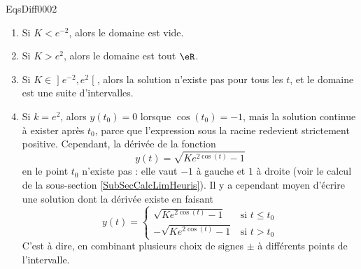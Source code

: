 \begin{corrige}{EqsDiff0002}
\begin{enumerate}
\begin{enumerate}
\item
Si $K<e^{-2}$, alors le domaine est vide.
\item
Si $K>e^2$, alors le domaine est tout $\eR$.
\item
Si $K\in\mathopen]e^{-2},e^2\mathclose[$, alors la solution n'existe pas pour tous les $t$, et le domaine est une suite d'intervalles.
\item
Si $k=e^2$, alors $y(t_0)=0$ lorsque $\cos(t_0)=-1$, mais la solution continue à exister après $t_0$, parce que l'expression sous la racine redevient strictement positive. Cependant, la dérivée de la fonction
\begin{equation}
	y(t)=\sqrt{K e^{2\cos(t)}-1}
\end{equation}
en le point $t_0$ n'existe pas  : elle vaut $-1$ à gauche et $1$ à droite (voir le calcul de la sous-section \ref{SubSecCalcLimHeuris}). Il y a cependant moyen d'écrire une solution dont la dérivée existe en faisant
\begin{equation}
	y(t)=\begin{cases}
	\sqrt{Ke^{2\cos(t)}-1}	&	\text{si }t\leq t_0\\
	-\sqrt{Ke^{2\cos(t)}-1}		&	 \text{si }t> t_0
\end{cases}
\end{equation}
C'est à dire, en combinant plusieurs choix de signes $\pm$ à différents points de l'intervalle.

\end{enumerate}
\end{enumerate}

\end{corrige}
